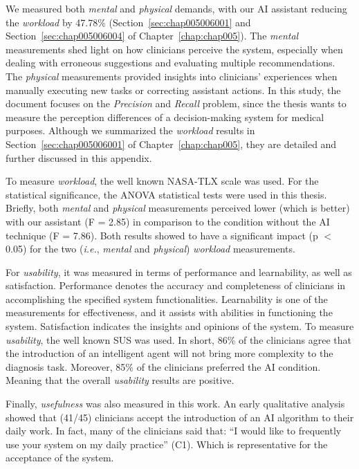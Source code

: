 \textcolor{revised}{We measured both {\it mental} and {\it physical} demands, with our \ac{AI} assistant reducing the {\it workload} by 47.78\% (Section~\ref{sec:chap005006001} and Section~\ref{sec:chap005006004} of Chapter~\ref{chap:chap005}).
The {\it mental} measurements shed light on how clinicians perceive the system, especially when dealing with erroneous suggestions and evaluating multiple recommendations.
The {\it physical} measurements provided insights into clinicians' experiences when manually executing new tasks or correcting assistant actions.}
In this study, the document focuses on the {\it Precision} and {\it Recall} problem, since the thesis wants to measure the perception differences of a decision-making system for medical purposes.
Although we summarized the {\it workload} results in Section~\ref{sec:chap005006001} of Chapter~\ref{chap:chap005}, they are detailed and further discussed in this appendix.

To measure {\it workload}, the well known \ac{NASA-TLX} scale was used.
For the statistical significance, the \ac{ANOVA} statistical tests were used in this thesis.
Briefly, both {\it mental} and {\it physical} measurements perceived lower (which is better) with our assistant (F = 2.85) in comparison to the condition without the \ac{AI} technique (F = 7.86).
Both results showed to have a significant impact (p $<$ 0.05) for the two ({\it i.e.}, {\it mental} and {\it physical}) {\it workload} measurements.

For {\it usability}, it was measured in terms of performance and learnability, as well as satisfaction.
Performance denotes the accuracy and completeness of clinicians in accomplishing the specified system functionalities.
Learnability is one of the measurements for effectiveness, and it assists with abilities in functioning the system.
Satisfaction indicates the insights and opinions of the system.
To measure {\it usability}, the well known \ac{SUS} was used.
In short, 86\% of the clinicians agree that the introduction of an intelligent agent will not bring more complexity to the diagnosis task.
Moreover, 85\% of the clinicians preferred the \ac{AI} condition.
Meaning that the overall {\it usability} results are positive.

Finally, {\it usefulness} was also measured in this work.
An early qualitative analysis showed that (41/45) clinicians accept the introduction of an \ac{AI} algorithm to their daily work.
In fact, many of the clinicians said that: ``I would like to frequently use your system on my daily practice'' (C1).
Which is representative for the acceptance of the system.

